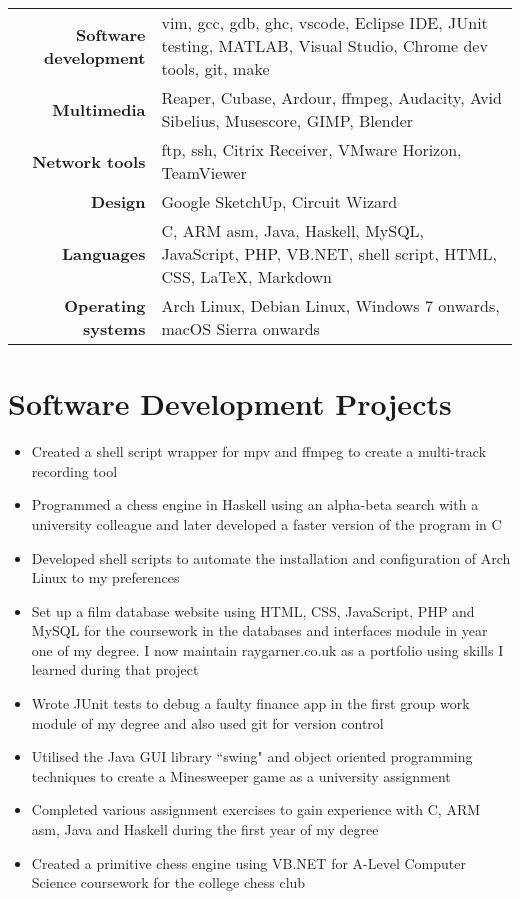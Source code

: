 \documentclass{article}
\begin{document}
\begin{tabular}{ r | p{11cm} }

{\large\bfseries Software development} & {vim, gcc, gdb, ghc, vscode, Eclipse IDE, JUnit testing, MATLAB, Visual Studio, Chrome dev tools, git, make}\\
{\large\bfseries Multimedia} & {Reaper, Cubase, Ardour, ffmpeg, Audacity, Avid Sibelius, Musescore, GIMP, Blender} \\
{\large\bfseries Network tools} & {ftp, ssh, Citrix Receiver, VMware Horizon, TeamViewer} \\
{\large\bfseries Design} & {Google SketchUp, Circuit Wizard} \\
{\large\bfseries Languages} & {C, ARM asm, Java, Haskell, MySQL, JavaScript, PHP, VB.NET, shell script, HTML, CSS, \LaTeX, Markdown}\\
{\large\bfseries Operating systems} & {Arch Linux, Debian Linux, Windows 7 onwards, macOS Sierra onwards}\\
\end{tabular}

\section{Software Development Projects}

\begin{itemize}[noitemsep]

\renewcommand{\labelitemi}{$\square$}

\item Created a shell script wrapper for mpv and ffmpeg to create a multi-track recording tool
\item Programmed a chess engine in Haskell using an alpha-beta search with a university colleague and later developed a faster version of the program in C
\item Developed shell scripts to automate the installation and configuration of Arch Linux to my preferences 
\item Set up a film database website using HTML, CSS, JavaScript, PHP and MySQL for the coursework in the databases and interfaces module in year one of my degree. I now maintain raygarner.co.uk as a portfolio using skills I learned during that project
\item Wrote JUnit tests to debug a faulty finance app in the first group work module of my degree and also used git for version control
\item Utilised the Java GUI library ``swing" and object oriented programming techniques to create a Minesweeper game as a university assignment
\item Completed various assignment exercises to gain experience with C, ARM asm, Java and Haskell during the first year of my degree
\item Created a primitive chess engine using VB.NET for A-Level Computer Science coursework for the college chess club

\end{itemize}
\end{document}
